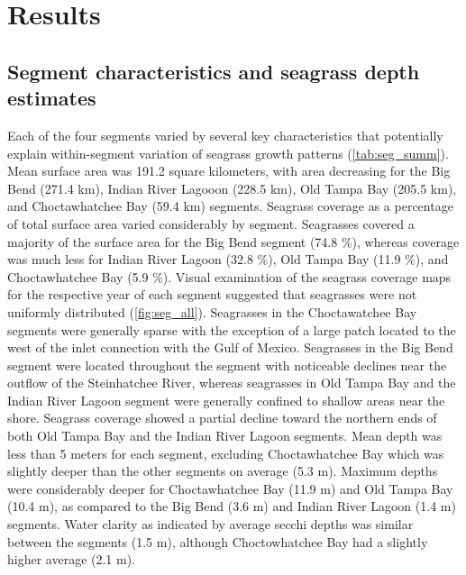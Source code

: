 \documentclass[letterpaper,12pt,oneside]{article}\usepackage[]{graphicx}\usepackage[]{color}
\begin{document}
\section{Results}

\subsection{Segment characteristics and seagrass depth estimates}



Each of the four segments varied by several key characteristics that potentially explain within-segment variation of seagrass growth patterns (\cref{tab:seg_summ}).  Mean surface area was 191.2 square kilometers, with area decreasing for the Big Bend (271.4 km), Indian River Lagooon (228.5 km), Old Tampa Bay (205.5 km), and Choctawhatchee Bay (59.4 km) segments.  Seagrass coverage as a percentage of total surface area varied considerably by segment.  Seagrasses covered a majority of the surface area for the Big Bend segment (74.8 \%), whereas coverage was much less for Indian River Lagoon (32.8 \%), Old Tampa Bay (11.9 \%), and Choctawhatchee Bay (5.9 \%).  Visual examination of the seagrass coverage maps for the respective year of each segment suggested that seagrasses were not uniformly distributed (\cref{fig:seg_all}).  Seagrasses in the Choctawatchee Bay segments were generally sparse with the exception of a large patch located to the west of the inlet connection with the Gulf of Mexico.  Seagrasses in the Big Bend segment were located throughout the segment with noticeable declines near the outflow of the Steinhatchee River, whereas seagrasses in Old Tampa Bay and the Indian River Lagoon segment were generally confined to shallow areas near the shore. Seagrass coverage showed a partial decline toward the northern ends of both Old Tampa Bay and the Indian River Lagoon segments.  Mean depth was less than 5 meters for each segment, excluding Choctawhatchee Bay which was slightly deeper than the other segments on average (5.3 m).  Maximum depths were considerably deeper for Choctawhatchee Bay (11.9 m) and Old Tampa Bay (10.4 m), as compared to the Big Bend (3.6 m) and Indian River Lagoon (1.4 m) segments.  Water clarity as indicated by average secchi depths was similar between the segments (1.5 m), although Choctowhatchee Bay had a slightly higher average (2.1 m).     

\end{document}
